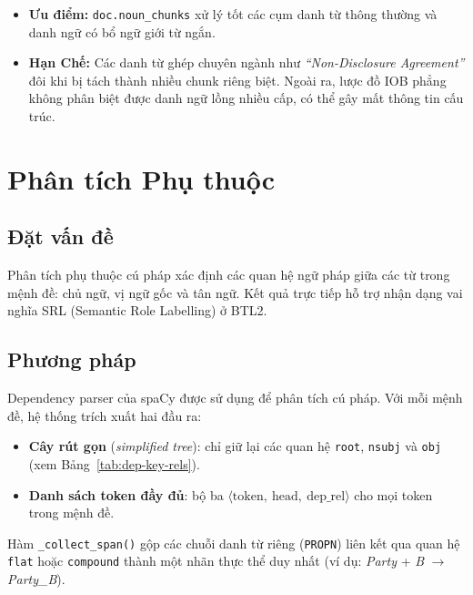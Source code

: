 \begin{itemize}
    \item \textbf{Ưu điểm:} \texttt{doc.noun\_chunks} xử lý tốt các cụm danh từ thông thường và
danh ngữ có bổ ngữ giới từ ngắn.
    \item \textbf{Hạn Chế:} Các danh từ ghép chuyên ngành như \textit{``Non-Disclosure Agreement''}
đôi khi bị tách thành nhiều chunk riêng biệt. Ngoài ra, lược đồ IOB
phẳng không phân biệt được danh ngữ lồng nhiều cấp, có thể gây mất
thông tin cấu trúc.
\end{itemize}


\section{Phân tích Phụ thuộc}
\label{sec:dependency}

\subsection{Đặt vấn đề}

Phân tích phụ thuộc cú pháp xác định các quan hệ ngữ pháp giữa các từ
trong mệnh đề: chủ ngữ, vị ngữ gốc và tân ngữ. Kết quả trực tiếp hỗ
trợ nhận dạng vai nghĩa SRL (Semantic Role Labelling) ở BTL2.

\subsection{Phương pháp}

Dependency parser của spaCy được sử dụng để phân tích cú pháp. Với mỗi
mệnh đề, hệ thống trích xuất hai đầu ra:

\begin{itemize}
    \item \textbf{Cây rút gọn} (\textit{simplified tree}): chỉ giữ lại
          các quan hệ \texttt{root}, \texttt{nsubj} và \texttt{obj}
          (xem Bảng~\ref{tab:dep-key-rels}).
    \item \textbf{Danh sách token đầy đủ}: bộ ba
          $\langle\text{token},\ \text{head},\ \text{dep\_rel}\rangle$
          cho mọi token trong mệnh đề.
\end{itemize}

Hàm \texttt{\_collect\_span()} gộp các chuỗi danh từ riêng
(\texttt{PROPN}) liên kết qua quan hệ \texttt{flat} hoặc
\texttt{compound} thành một nhãn thực thể duy nhất
(ví dụ: \textit{Party} + \textit{B} $\to$ \textit{Party\_B}).

